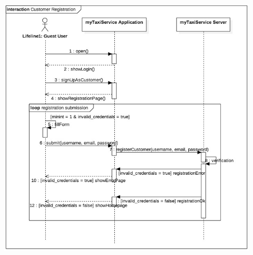 				\begin{center}
					\includegraphics[scale=0.5]{IMG/InteractionDiagrams/CustomerRegistration_Normal.png}
				\end{center}